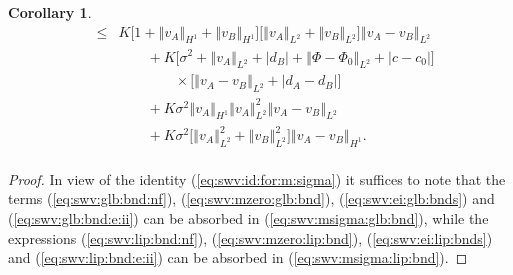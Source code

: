 \documentclass[10pt]{articleHJ}
\newcommand{\abs}[1]{\left\vert#1\right\vert}			%
\newcommand{\norm}[1]{\left\Vert#1\right\Vert}		%
\newcommand{\sref}[1]{(\ref{#1})}                       %
\newtheorem{cor}[thm]{Corollary}
\numberwithin{equation}{section}
\begin{document}
\begin{cor}
\begin{equation}
\begin{array}{lcl}
 & \le &
  K \big[ 1 + \norm{v_A}_{H^1} + \norm{v_B}_{H^1} \big]
    \big[ \norm{v_A}_{L^2}  + \norm{v_B}_{L^2} \big]
     \norm{v_A-v_B}_{L^2}
\\[0.2cm]
& & \qquad
+ K \big[
  \sigma^2 +
  \norm{v_A}_{L^2} + \abs{d_B}
   +  \norm{\Phi - \Phi_0}_{L^2}
  + \abs{c - c_0} \big]
\\[0.2cm]
& & \qquad \qquad \times
  \big[
     \norm{v_A-v_B}_{L^2}
      + \abs{d_A - d_B}
  \big]
\\[0.2cm]
& & \qquad
+ K \sigma^2
    \norm{v_A}_{H^1} \norm{v_A}_{L^2}^2
    \norm{v_A-v_B}_{L^2}
\\[0.2cm]
& & \qquad
  + K \sigma^2
  \Big[  \norm{v_A}_{L^2}^2 + \norm{v_B}_{L^2}^2 \Big]
    \norm{v_A-v_B}_{H^1} .
\\[0.2cm]
\end{array}
\end{equation}
\end{cor}
\begin{proof}
In view of the identity
\sref{eq:swv:id:for:m:sigma}
it suffices to note that
the terms
\sref{eq:swv:glb:bnd:nf},
\sref{eq:swv:mzero:glb:bnd},
\sref{eq:swv:ei:glb:bnds}
and \sref{eq:swv:glb:bnd:e:ii}
can be absorbed
in \sref{eq:swv:msigma:glb:bnd},
while the expressions
\sref{eq:swv:lip:bnd:nf},
\sref{eq:swv:mzero:lip:bnd},
\sref{eq:swv:ei:lip:bnds} and
\sref{eq:swv:lip:bnd:e:ii}
can be absorbed in \sref{eq:swv:msigma:lip:bnd}.
\end{proof}
\end{document}
